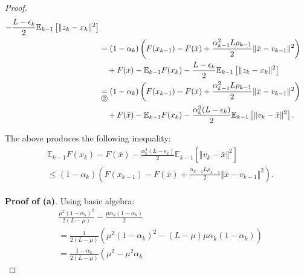 \documentclass[12pt]{article}
\newcommand{\expect}{\ensuremath{\mathbb E}}
\begin{document}
\begin{proof}
{\begin{align*}
                - \frac{L - \epsilon_k}{2}\expect_{k - 1} \left[\Vert z_k - x_k\Vert^2\right]
            \\&= 
            (1 - \alpha_k)\left(
                F(x_{k - 1}) - F(\bar x)
                + \frac{\alpha_{k - 1}^2L\rho_{k - 1}}{2}\Vert \bar x - v_{k - 1}\Vert^2
            \right)
                \\ &\quad 
                + F(\bar x) - \expect_{k - 1}F(x_k) 
                - \frac{L - \epsilon_k}{2}\expect_{k - 1} \left[\Vert z_k - x_k\Vert^2\right]
            \\
            &\underset{\circled{2}}{=} 
            (1 - \alpha_k)\left(
                F(x_{k - 1}) - F(\bar x)
                + \frac{\alpha_{k - 1}^2L\rho_{k - 1}}{2}\Vert \bar x - v_{k - 1}\Vert^2
            \right)
                \\ &\quad 
                + F(\bar x) - \expect_{k - 1}F(x_k) 
                - \frac{\alpha_k^2(L - \epsilon_k)}{2}\expect_{k - 1} \left[\Vert v_k - \bar x\Vert^2\right]. 
        \end{align*}
        }
        \par
        The above produces the following inequality: 
        \begin{align}\begin{split}
            & \expect_{k - 1}F(x_k) - F(\bar x) - \frac{\alpha_k^2(L - \epsilon_k)}{2}\expect_{k - 1} \left[\Vert v_k - \bar x\Vert^2\right]
            \\
            &\le 
            (1 - \alpha_k)\left(
                F(x_{k - 1}) - F(\bar x)
                + \frac{\alpha_{k - 1}L\rho_{k - 1}}{2}\Vert \bar x - v_{k - 1}\Vert^2
            \right). 
        \end{split}\end{align}
        \par \textbf{Proof of (a)}. 
        Using basic algebra: 
        {\allowdisplaybreaks
        \begin{align*}
            & \frac{\mu^2(1 - \alpha_k)^2}{2(L - \mu)} 
            - \frac{\mu\alpha_k(1 - \alpha_k)}{2}
            \\
            &= 
            \frac{1}{2\left(L - \mu\right)}
            \left(
                \mu^2(1 - \alpha_k)^2
                - \left(L - \mu\right)\mu \alpha_k(1 - \alpha_k)
            \right)
            \\
            &= \frac{1 - \alpha_k}{2\left(L - \mu\right)}\left(
                \mu^2 
                - \mu^2\alpha_k 

\end{align*}}
\end{proof}
\end{document}

